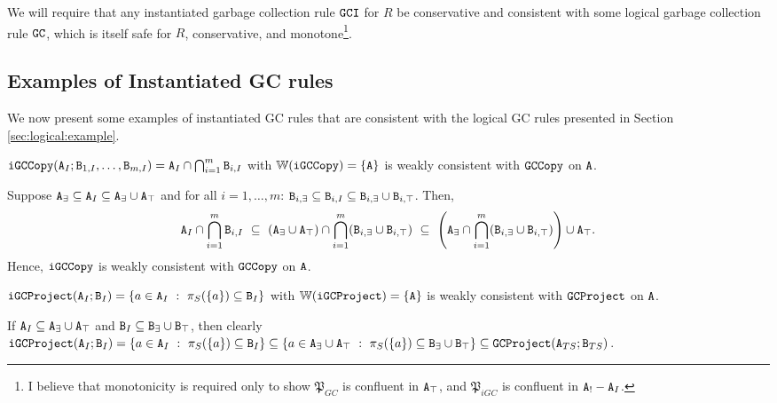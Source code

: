 We will require that any instantiated garbage collection rule $\tt{GCI}$ for $R$ be conservative and consistent with some logical garbage collection rule $\tt{GC}$, which is itself safe for $R$, conservative, and monotone\footnote{
  I believe that monotonicity is required only to show $\mathfrak{P}_{GC}$ is confluent in $\tt{A}_\top$, and $\mathfrak{P}_{iGC}$ is confluent in $\tt{A}_! - \tt{A}_I$.
}.



\subsection{Examples of Instantiated GC rules}
We now present some examples of instantiated GC rules that are consistent with the logical GC rules presented in Section \ref{sec:logical:example}.

\begin{example}[Copy GC]
$\tt{iGCCopy}(\tt{A}_I; \tt{B}_{1,I}, \dots, \tt{B}_{m,I}) = \tt{A}_I \cap \bigcap_{i=1}^m \tt{B}_{i,I}$ with $\mathbb{W}(\tt{iGCCopy}) = \{\tt{A}\}$ is weakly consistent with $\tt{GCCopy}$ on $\tt{A}$.
\end{example}
Suppose
$\tt{A}_\exists \subseteq \tt{A}_I \subseteq \tt{A}_\exists \cup \tt{A}_\top$
and for all $i = 1, \dots, m$:
$\tt{B}_{i,\exists} \subseteq \tt{B}_{i,I} \subseteq \tt{B}_{i,\exists} \cup \tt{B}_{i,\top}$.
Then,
\begin{align*}
\tt{A}_I \cap \bigcap_{i=1}^m \tt{B}_{i,I}
~\subseteq~
(\tt{A}_\exists \cup \tt{A}_\top) \cap \bigcap_{i=1}^m (\tt{B}_{i,\exists} \cup \tt{B}_{i,\top})
~\subseteq~
\left(\tt{A}_\exists \cap \bigcap_{i=1}^m (\tt{B}_{i,\exists} \cup \tt{B}_{i,\top})\right)
\cup
\tt{A}_\top.
\end{align*}
Hence, $\tt{iGCCopy}$ is weakly consistent with $\tt{GCCopy}$ on $\tt{A}$.

\begin{example}[Project GC]
$\tt{iGCProject}(\tt{A}_I; \tt{B}_I) = \{a \in \tt{A}_I ~:~ \pi_S(\{a\}) \subseteq \tt{B}_I\}$ with $\mathbb{W}(\tt{iGCProject}) = \{\tt{A}\}$ is weakly consistent with $\tt{GCProject}$ on $\tt{A}$.
\end{example}

If $\tt{A}_I \subseteq \tt{A}_\exists \cup \tt{A}_\top$ and $\tt{B}_I \subseteq \tt{B}_\exists \cup \tt{B}_\top$, then
clearly $\tt{iGCProject}(\tt{A}_I; \tt{B}_I) = \{a \in \tt{A}_I ~:~ \pi_S(\{a\}) \subseteq \tt{B}_I\} \subseteq \{a \in \tt{A}_\exists \cup \tt{A}_\top ~:~ \pi_S(\{a\}) \subseteq \tt{B}_\exists \cup \tt{B}_\top\} \subseteq \tt{GCProject}(\tt{A}_{TS}; \tt{B}_{TS})$.

